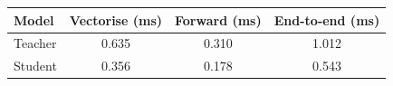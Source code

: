 \begin{tabular}{lccc}
\toprule
Model & Vectorise (ms) & Forward (ms) & End-to-end (ms) \\
\midrule
Teacher & 0.635 & 0.310 & 1.012 \\
Student & 0.356 & 0.178 & 0.543 \\
\bottomrule
\end{tabular}
